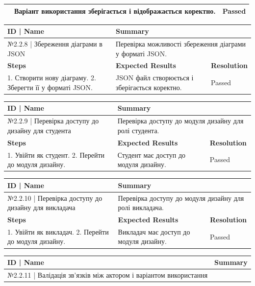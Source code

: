 \documentclass[oneside,14pt]{extarticle}
\begin{document}
\begin{normalsize}
\begin{longtable}{|p{7cm}|p{3.5cm}|p{3.5cm}|}
		& Варіант використання зберігається і відображається коректно. & Passed \\ \hline
	\end{longtable}
	\begin{longtable}{|p{7cm}|p{3.5cm}|p{3.5cm}|} 
	\hline \textbf{ID | Name} &\multicolumn{2}{|p{7cm}|}{\textbf{Summary}} 
	\\\hline №2.2.8 | Збереження діаграми в JSON & \multicolumn{2}{|p{7cm}|}{Перевірка
			можливості збереження діаграми у форматі JSON.} \\ \hline \textbf{Steps} & \textbf{Expected Results} & \textbf{Resolution} \\ \hline1. Створити нову діаграму.
		2. Зберегти її у форматі JSON. & JSON файл створюється і зберігається коректно.
		& Passed \\ \hline \end{longtable}
		\begin{longtable}{|p{7cm}|p{3.5cm}|p{3.5cm}|} 
		\hline \textbf{ID | Name} &\multicolumn{2}{|p{7cm}|}{\textbf{Summary}} 
		\\\hline №2.2.9 | Перевірка доступу до дизайну для студента &
		\multicolumn{2}{|p{7cm}|}{Перевірка доступу до модуля дизайну для ролі
			студента.}
		\\ \hline \textbf{Steps} & \textbf{Expected Results} & \textbf{Resolution} \\ \hline 1. Увійти як студент. 2. Перейти до модуля дизайну. & Студент має
		доступ до модуля дизайну. & Passed \\ \hline \end{longtable}
		\begin{longtable}{|p{7cm}|p{3.5cm}|p{3.5cm}|} 
		\hline \textbf{ID | Name} &\multicolumn{2}{|p{7cm}|}{\textbf{Summary}} 
		\\\hline №2.2.10 | Перевірка доступу до дизайну
		для викладача & \multicolumn{2}{|p{7cm}|}{Перевірка доступу до модуля дизайну для ролі викладача.} \\ \hline \textbf{Steps} & \textbf{Expected Results} & \textbf{Resolution} \\ \hline1. Увійти як викладач. 2. Перейти до модуля дизайну. & Викладач має доступ до модуля дизайну. & Passed \\ \hline \end{longtable}
		\begin{longtable}{|p{7cm}|p{3.5cm}|p{3.5cm}|} 
		\hline \textbf{ID | Name} &\multicolumn{2}{|p{7cm}|}{\textbf{Summary}} 
		\\\hline №2.2.11
		| Валідація зв’язків між актором і варіантом використання &

\end{longtable}
\end{normalsize}
\end{document}
